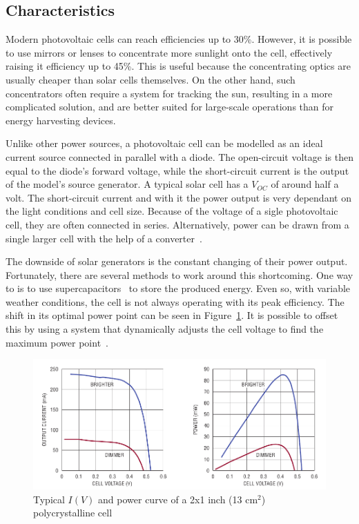 \documentclass[a4paper,10pt]{article}
\begin{document}
\subsection{Characteristics}

Modern photovoltaic cells can reach efficiencies up to 30\%. However, it is possible to use mirrors or lenses to concentrate more sunlight onto the cell, effectively raising it efficiency up to 45\%. This is useful because the concentrating optics are usually cheaper than solar cells themselves. On the other hand, such concentrators often require a system for tracking the sun, resulting in a more complicated solution, and are better suited for large-scale operations than for energy harvesting devices. 

Unlike other power sources, a photovoltaic cell can be modelled as an ideal current source connected in parallel with a diode. The open-circuit voltage is then equal to the diode's forward voltage, while the short-circuit current is the output of the model's source generator. A typical solar cell has a $V_{OC}$ of around half a volt. The short-circuit current and with it the power output is very dependant on the light conditions and cell size. Because of the voltage of a sigle photovoltaic cell, they are often connected in series. Alternatively, power can be drawn from a single larger cell with the help of a converter~\cite{Burgoine11}. 

The downside of solar generators is the constant changing of their power output. Fortunately, there are several methods to work around this shortcoming. One way to is to use supercapacitors~\cite{cap-wsn-ieee} to store the produced energy. Even so, with variable weather conditions, the cell is not always operating with its peak efficiency. The shift in its optimal power point can be seen in Figure~\ref{fig:pv-power-curve}. It is possible to offset this by using a system that dynamically adjusts the cell voltage to find the maximum power point~\cite{solar-mppt-ieee}. 

\begin{figure}[h!]
\includegraphics[width=\textwidth]{./Slike/PV-power-curve}
 \caption{Typical $I(V)$ and power curve of a 2x1 inch (13 cm$^2$) polycrystalline cell~\cite{Burgoine11}}
\label{fig:pv-power-curve}
\end{figure}
\end{document}
